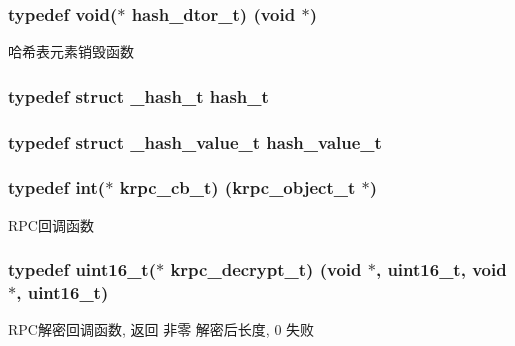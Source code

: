\subsubsection[{hash\+\_\+dtor\+\_\+t}]{\setlength{\rightskip}{0pt plus 5cm}typedef void($\ast$ hash\+\_\+dtor\+\_\+t) (void $\ast$)}\label{a00047_a5dcd1ed9242185e4448352748e58573d_a5dcd1ed9242185e4448352748e58573d}
哈希表元素销毁函数 \hypertarget{a00047_a188677c3015513590ab998e96b999966_a188677c3015513590ab998e96b999966}{}
\subsubsection[{hash\+\_\+t}]{\setlength{\rightskip}{0pt plus 5cm}typedef struct {\bf \+\_\+hash\+\_\+t} {\bf hash\+\_\+t}}\label{a00047_a188677c3015513590ab998e96b999966_a188677c3015513590ab998e96b999966}
\hypertarget{a00047_af7ecd66aeef0ce1b0495e5f65e77733e_af7ecd66aeef0ce1b0495e5f65e77733e}{}
\subsubsection[{hash\+\_\+value\+\_\+t}]{\setlength{\rightskip}{0pt plus 5cm}typedef struct {\bf \+\_\+hash\+\_\+value\+\_\+t} {\bf hash\+\_\+value\+\_\+t}}\label{a00047_af7ecd66aeef0ce1b0495e5f65e77733e_af7ecd66aeef0ce1b0495e5f65e77733e}
\hypertarget{a00047_a06bb708c1b97445d3a5d0c1b32ad2ab6_a06bb708c1b97445d3a5d0c1b32ad2ab6}{}
\subsubsection[{krpc\+\_\+cb\+\_\+t}]{\setlength{\rightskip}{0pt plus 5cm}typedef int($\ast$ krpc\+\_\+cb\+\_\+t) ({\bf krpc\+\_\+object\+\_\+t} $\ast$)}\label{a00047_a06bb708c1b97445d3a5d0c1b32ad2ab6_a06bb708c1b97445d3a5d0c1b32ad2ab6}
R\+P\+C回调函数 \hypertarget{a00047_a5cf750f151c90f0589f68fe8c4421f1d_a5cf750f151c90f0589f68fe8c4421f1d}{}
\subsubsection[{krpc\+\_\+decrypt\+\_\+t}]{\setlength{\rightskip}{0pt plus 5cm}typedef uint16\+\_\+t($\ast$ krpc\+\_\+decrypt\+\_\+t) (void $\ast$, uint16\+\_\+t, void $\ast$, uint16\+\_\+t)}\label{a00047_a5cf750f151c90f0589f68fe8c4421f1d_a5cf750f151c90f0589f68fe8c4421f1d}
R\+P\+C解密回调函数, 返回 非零 解密后长度, 0 失败 \hypertarget{a00047_ae41a67cc07f8dff897ca978e03b1f2d7_ae41a67cc07f8dff897ca978e03b1f2d7}{}
